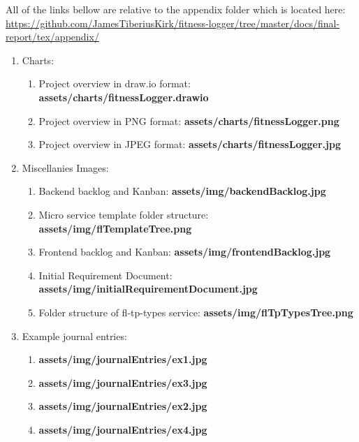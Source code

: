 \documentclass{article}
\begin{document}
\begin{multicols}{2}
All of the links bellow are relative to the appendix folder which is located here: \url{https://github.com/JamesTiberiusKirk/fitness-logger/tree/master/docs/final-report/tex/appendix/}
\begin{enumerate}
  \item Charts:
    \begin{enumerate}
      \item Project overview in draw.io format: \textbf{assets/charts/fitnessLogger.drawio}\\  
      \item Project overview in PNG format: \textbf{assets/charts/fitnessLogger.png}\\  
      \item Project overview in JPEG format: \textbf{assets/charts/fitnessLogger.jpg}\\
    \end{enumerate}
  \item Miscellanies Images:\\
    \begin{enumerate}
      \item Backend backlog and Kanban: \textbf{assets/img/backendBacklog.jpg}\\
      \item Micro service template folder structure: \textbf{assets/img/flTemplateTree.png}\\
      \item Frontend backlog and Kanban: \textbf{assets/img/frontendBacklog.jpg}\\
      \item Initial Requirement Document: \textbf{assets/img/initialRequirementDocument.jpg}\\
      \item Folder structure of fl-tp-types service: \textbf{assets/img/flTpTypesTree.png}\\
    \end{enumerate}
  \item Example journal entries:
    \begin{enumerate}
      \item \textbf{assets/img/journalEntries/ex1.jpg}\\
      \item \textbf{assets/img/journalEntries/ex3.jpg}\\
      \item \textbf{assets/img/journalEntries/ex2.jpg}\\ 
      \item \textbf{assets/img/journalEntries/ex4.jpg}\\ 

\end{enumerate}
\end{enumerate}
\end{multicols}
\end{document}
